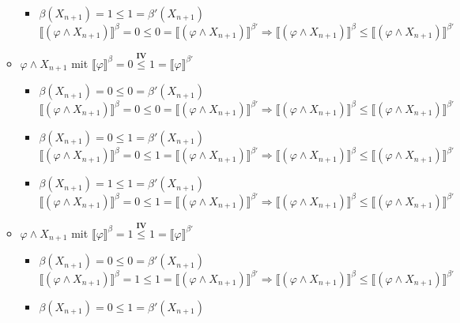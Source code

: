 \documentclass[a4paper,10pt]{article}
\begin{document}
\begin{itemize}
\begin{itemize}
\begin{itemize}
\item $\beta(X_{n+1}) = 1 \leq 1 = \beta'(X_{n+1})$ \\
$\llbracket (\varphi \land X_{n+1}) \rrbracket^{\beta} = 0 \leq 0 = \llbracket (\varphi \land X_{n+1})  \rrbracket^{\beta'} \Rightarrow \llbracket (\varphi \land X_{n+1})  \rrbracket^{\beta} \leq \llbracket (\varphi \land X_{n+1})  \rrbracket^{\beta'} $
\end{itemize}
\item $\varphi \land X_{n+1}$ mit $\llbracket \varphi \rrbracket^{\beta} = 0 \stackrel{\textbf{IV}}{\leq} 1 = \llbracket \varphi \rrbracket^{\beta'}$ 
\begin{itemize}
\item $\beta(X_{n+1}) = 0 \leq 0 = \beta'(X_{n+1})$ \\
$\llbracket (\varphi \land X_{n+1}) \rrbracket^{\beta} = 0 \leq 0 = \llbracket (\varphi \land X_{n+1})  \rrbracket^{\beta'} \Rightarrow \llbracket (\varphi \land X_{n+1})  \rrbracket^{\beta} \leq \llbracket (\varphi \land X_{n+1})  \rrbracket^{\beta'} $
\item $\beta(X_{n+1}) = 0 \leq 1 = \beta'(X_{n+1})$ \\
$\llbracket (\varphi \land X_{n+1}) \rrbracket^{\beta} = 0 \leq 1 = \llbracket (\varphi \land X_{n+1})  \rrbracket^{\beta'} \Rightarrow \llbracket (\varphi \land X_{n+1})  \rrbracket^{\beta} \leq \llbracket (\varphi \land X_{n+1})  \rrbracket^{\beta'} $
\item $\beta(X_{n+1}) = 1 \leq 1 = \beta'(X_{n+1})$ \\
$\llbracket (\varphi \land X_{n+1}) \rrbracket^{\beta} = 0 \leq 1 = \llbracket (\varphi \land X_{n+1})  \rrbracket^{\beta'} \Rightarrow \llbracket (\varphi \land X_{n+1})  \rrbracket^{\beta} \leq \llbracket (\varphi \land X_{n+1})  \rrbracket^{\beta'} $
\end{itemize}
\item $\varphi \land X_{n+1}$ mit $\llbracket \varphi \rrbracket^{\beta} = 1 \stackrel{\textbf{IV}}{\leq} 1 = \llbracket \varphi \rrbracket^{\beta'}$ 
\begin{itemize}
\item $\beta(X_{n+1}) = 0 \leq 0 = \beta'(X_{n+1})$ \\
$\llbracket (\varphi \land X_{n+1}) \rrbracket^{\beta} = 1 \leq 1 = \llbracket (\varphi \land X_{n+1})  \rrbracket^{\beta'} \Rightarrow \llbracket (\varphi \land X_{n+1})  \rrbracket^{\beta} \leq \llbracket (\varphi \land X_{n+1})  \rrbracket^{\beta'} $
\item $\beta(X_{n+1}) = 0 \leq 1 = \beta'(X_{n+1})$ \\

\end{itemize}
\end{itemize}
\end{itemize}
\end{document}
